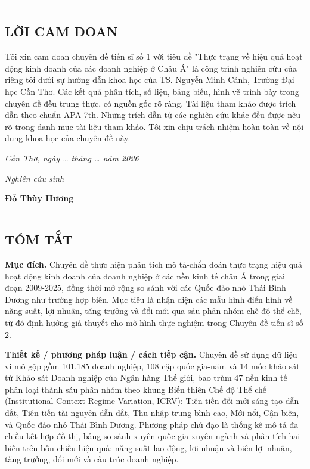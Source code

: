 \documentclass[12pt,a4paper]{article}
\begin{document}
\begin{center}\rule{0.5\linewidth}{0.5pt}\end{center}

\hypertarget{lux1eddi-cam-ux111oan}{%
\subsection{LỜI CAM ĐOAN}\label{lux1eddi-cam-ux111oan}}

Tôi xin cam đoan chuyên đề tiến sĩ số 1 với tiêu đề "Thực trạng về hiệu
quả hoạt động kinh doanh của các doanh nghiệp ở Châu Á" là công trình
nghiên cứu của riêng tôi dưới sự hướng dẫn khoa học của TS. Nguyễn Minh
Cảnh, Trường Đại học Cần Thơ. Các kết quả phân tích, số liệu, bảng biểu,
hình vẽ trình bày trong chuyên đề đều trung thực, có nguồn gốc rõ ràng.
Tài liệu tham khảo được trích dẫn theo chuẩn APA 7th. Những trích dẫn từ
các nghiên cứu khác đều được nêu rõ trong danh mục tài liệu tham khảo.
Tôi xin chịu trách nhiệm hoàn toàn về nội dung khoa học của chuyên đề
này.

\emph{Cần Thơ, ngày \ldots{} tháng \ldots{} năm 2026}

\emph{Nghiên cứu sinh}

\textbf{Đỗ Thùy Hương}

\begin{center}\rule{0.5\linewidth}{0.5pt}\end{center}

\hypertarget{tuxf3m-tux1eaft}{%
\subsection{TÓM TẮT}\label{tuxf3m-tux1eaft}}

\textbf{Mục đích.} Chuyên đề thực hiện phân tích mô tả-chẩn đoán thực
trạng hiệu quả hoạt động kinh doanh của doanh nghiệp ở các nền kinh tế
châu Á trong giai đoạn 2009-2025, đồng thời mở rộng so sánh với các Quốc
đảo nhỏ Thái Bình Dương như trường hợp biên. Mục tiêu là nhận diện các
mẫu hình điển hình về năng suất, lợi nhuận, tăng trưởng và đổi mới qua
sáu phân nhóm chế độ thể chế, từ đó định hướng giả thuyết cho mô hình
thực nghiệm trong Chuyên đề tiến sĩ số 2.

\textbf{Thiết kế / phương pháp luận / cách tiếp cận.} Chuyên đề sử dụng
dữ liệu vi mô gộp gồm 101.185 doanh nghiệp, 108 cặp quốc gia-năm và 14
mốc khảo sát từ Khảo sát Doanh nghiệp của Ngân hàng Thế giới, bao trùm
47 nền kinh tế phân loại thành sáu phân nhóm theo khung Biến thiên Chế
độ Thể chế (Institutional Context Regime Variation, ICRV): Tiên tiến đổi
mới sáng tạo dẫn dắt, Tiên tiến tài nguyên dẫn dắt, Thu nhập trung bình
cao, Mới nổi, Cận biên, và Quốc đảo nhỏ Thái Bình Dương. Phương pháp chủ
đạo là thống kê mô tả đa chiều kết hợp đồ thị, bảng so sánh xuyên quốc
gia-xuyên ngành và phân tích hai biến trên bốn chiều hiệu quả: năng suất
lao động, lợi nhuận và biên lợi nhuận, tăng trưởng, đổi mới và cấu trúc
doanh nghiệp.
\end{document}
